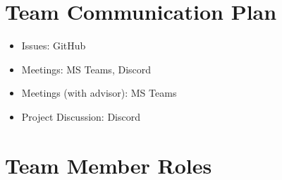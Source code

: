 \documentclass{article}
\begin{document}
\section{Team Communication Plan}

\begin{itemize}
  \item Issues: GitHub
  \item Meetings: MS Teams, Discord
  \item Meetings (with advisor): MS Teams
  \item Project Discussion: Discord
\end{itemize}

\section{Team Member Roles}
\end{document}

